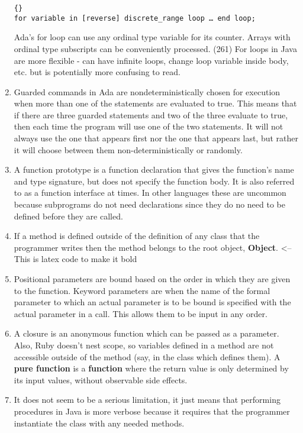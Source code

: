 \begin{answer}
\begin{enumerate}
\begin{lstlisting}{}
for variable in [reverse] discrete_range loop … end loop; 
\end{lstlisting}

Ada’s for loop can use any ordinal type variable for its
counter. Arrays with ordinal type subscripts can be conveniently
processed. (261) For loops in Java are more flexible - can have
infinite loops, change loop variable inside body, etc. but is
potentially more confusing to read.
\item Guarded commands in Ada are nondeterministically chosen for
  execution when more than one of the statements are evaluated to
  true. This means that if there are three guarded statements and two
  of the three evaluate to true, then each time the program will use
  one of the two statements. It will not always use the one that
  appears first nor the one that appears last, but rather it will
  choose between them non-deterministically or randomly.
\item A function prototype is a function declaration that gives the
  function's name and type signature, but does not specify the
  function body. It is also referred to as a function interface at
  times. In other languages these are uncommon because subprograms do
  not need declarations since they do no need to be defined before
  they are called.
\item If a method is defined outside of the definition of any class
  that the programmer writes then the method belongs to the root
  object, \textbf{Object}.  <--This is latex code to make it bold
\item Positional parameters are bound based on the order in which they
  are given to the function. Keyword parameters are when the name of
  the formal parameter to which an actual parameter is to be bound is
  specified with the actual parameter in a call. This allows them to
  be input in any order.
\item A closure is an anonymous function which can be passed as a
  parameter. Also, Ruby doesn't nest scope, so variables defined in a
  method are not accessible outside of the method (say, in the class
  which defines them).  A \textbf{pure function} is a
  \textbf{function} where the return value is only determined by its
  input values, without observable side effects.
\item It does not seem to be a serious limitation, it just means that
  performing procedures in Java is more verbose because it requires
  that the programmer instantiate the class with any needed methods.

\end{enumerate}
\end{answer}
